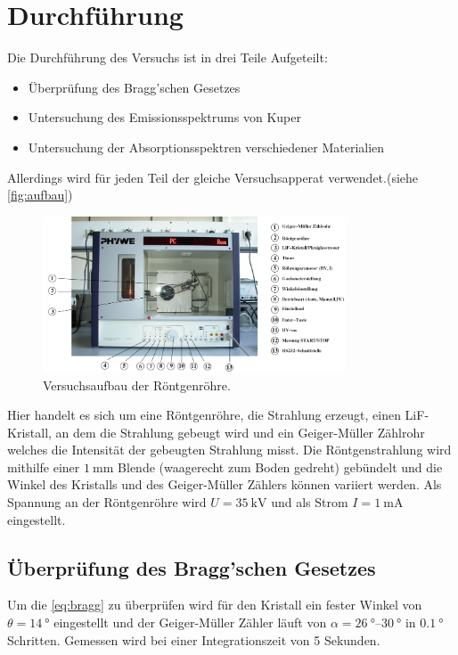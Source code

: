 \section{Durchführung}
\label{sec:Durchführung}

Die Durchführung des Versuchs ist in drei Teile Aufgeteilt:
\begin{itemize}
    \item Überprüfung des Bragg'schen Gesetzes
    \item Untersuchung des Emissionsspektrums von Kuper
    \item Untersuchung der Absorptionsspektren verschiedener Materialien
\end{itemize}
Allerdings wird für jeden Teil der gleiche Versuchsapperat verwendet.(siehe \autoref{fig:aufbau})

\begin{figure}
    \centering
    \includegraphics[width=0.8\textwidth]{images/aufbau.png}
    \caption{Versuchsaufbau der Röntgenröhre.}
    \label{fig:aufbau}
\end{figure}

Hier handelt es sich um eine Röntgenröhre, die Strahlung erzeugt, einen LiF-Kristall, an dem die Strahlung gebeugt wird und ein Geiger-Müller Zählrohr welches die Intensität der gebeugten Strahlung misst.
Die Röntgenstrahlung wird mithilfe einer $\SI{1}{\milli\metre}$ Blende (waagerecht zum Boden gedreht) gebündelt und die Winkel des Kristalls und des Geiger-Müller Zählers können variiert werden.
Als Spannung an der Röntgenröhre wird $U=\SI{35}{\kilo\volt}$ und als Strom $I=\SI{1}{\milli\ampere}$ eingestellt.


\subsection{Überprüfung des Bragg'schen Gesetzes}
\label{ssec:bragg}

Um die \autoref{eq:bragg} zu überprüfen wird für den Kristall ein fester Winkel von $\theta=\SI{14}{\degree}$ eingestellt und der Geiger-Müller Zähler läuft von $\alpha=\SIrange{26}{30}{\degree}$ in $\SI{0.1}{\degree}$ Schritten.
Gemessen wird bei einer Integrationszeit von 5 Sekunden.


